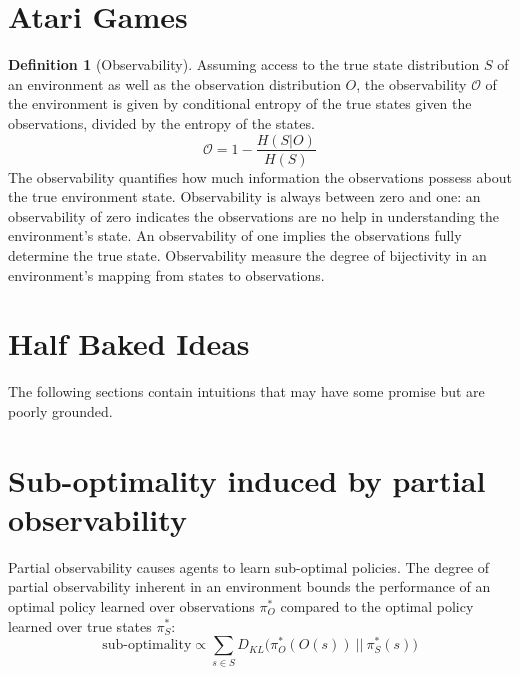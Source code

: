 \documentclass{article} %
\theoremstyle{definition}
\newtheorem{definition}{Definition}[section]
\begin{document}
\section{Atari Games}



\begin{definition}[Observability]
Assuming access to the true state distribution $S$ of an environment
as well as the observation distribution $O$, the observability
$\mathcal{O}$ of the environment is given by conditional entropy of
the true states given the observations, divided by the entropy of the
states.
\[
\mathcal{O} = 1 - \frac{H(S|O)}{H(S)}
\]
The observability quantifies how much information the observations
possess about the true environment state. Observability is always
between zero and one: an observability of zero indicates the
observations are no help in understanding the environment's state. An
observability of one implies the observations fully determine the true
state. Observability measure the degree of bijectivity in an
environment's mapping from states to observations.
\end{definition}


\section{Half Baked Ideas}
The following sections contain intuitions that may have some promise
but are poorly grounded.

\section{Sub-optimality induced by partial observability}
Partial observability causes agents to learn sub-optimal policies. The
degree of partial observability inherent in an environment bounds the
performance of an optimal policy learned over observations $\pi_O^*$
compared to the optimal policy learned over true states $\pi_S^*$:
\[
\textrm{sub-optimality} \propto \sum_{s\in S} D_{KL}\big(\pi_O^*(O(s))\ ||\ \pi_S^*(s)\big)
\]
\end{document}
